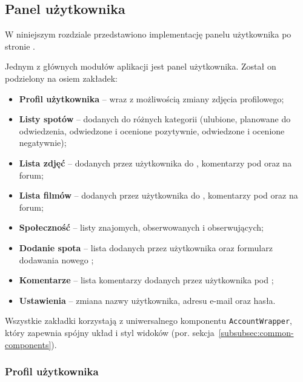 
\subsection{Panel użytkownika}
\label{subsec:panel-uzytkownika-frontend}

W niniejszym rozdziale przedstawiono implementację panelu użytkownika po stronie .

Jednym z głównych modułów aplikacji jest panel użytkownika.
Został on podzielony na osiem zakładek:

\begin{itemize}
    \item \textbf{Profil użytkownika} -- wraz z możliwością zmiany zdjęcia profilowego;
    \item \textbf{Listy spotów} -- dodanych do różnych kategorii (ulubione, planowane do odwiedzenia,
    odwiedzone i ocenione pozytywnie, odwiedzone i ocenione negatywnie);
    \item \textbf{Lista zdjęć} -- dodanych przez użytkownika do , komentarzy pod  oraz na forum;
    \item \textbf{Lista filmów} -- dodanych przez użytkownika do , komentarzy pod  oraz na forum;
    \item \textbf{Społeczność} -- listy znajomych, obserwowanych i obserwujących;
    \item \textbf{Dodanie spota} -- lista  dodanych przez użytkownika oraz formularz dodawania nowego ;
    \item \textbf{Komentarze} -- lista komentarzy dodanych przez użytkownika pod ;
    \item \textbf{Ustawienia} -- zmiana nazwy użytkownika, adresu e-mail oraz hasła.
\end{itemize}

Wszystkie zakładki korzystają z uniwersalnego komponentu \texttt{AccountWrapper}, który zapewnia spójny układ i styl
widoków (por. sekcja~\ref{subsubsec:common-components}).

\subsubsection{Profil użytkownika}
\label{subsubsec:profile}

